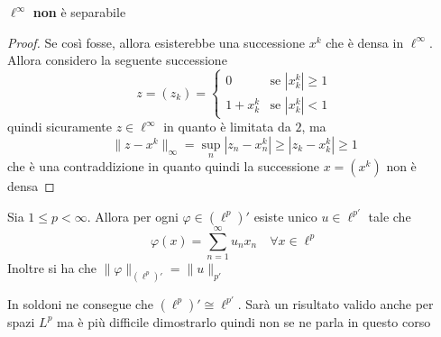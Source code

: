 \begin{proposition}
    \(\ell^{\infty}\) \textbf{non} è separabile
\end{proposition}
\begin{proof}
    Se così fosse, allora esisterebbe una successione \(x^{k}\) che è densa in
    \(\ell^{\infty}\). Allora considero la seguente successione
    \[
      z = {(z_k)} = \begin{cases}
          0 & \text{se } |x^{k}_{k}| \ge 1 \\
          1 + x^{k}_k & \text{se } |x^{k}_{k}| < 1
      \end{cases}
    \]
    quindi sicuramente \(z \in \ell^{\infty}\) in quanto è limitata da \(2\), ma
    \[\|z - x^{k}\|_{\infty} = \sup_n |z_{n} - x^{k}_n| \ge |z_k - x^{k}_k| \ge
    1\] 
    che è una contraddizione in quanto quindi la successione \(x= {(x^{k})}\)
    non è densa
\end{proof}
\begin{theorem}
    Sia \(1 \le p < \infty\). Allora per ogni \(\varphi  \in {(\ell^{p})}'\)
    esiste unico \(u \in \ell^{p'}\) tale che 
    \[
      \varphi {(x)} = \sum_{n=1}^{\infty} u_{n} x_{n} \quad \forall x \in
      \ell^{p} 
    \]
    Inoltre si ha che \(\|\varphi \|_{(\ell^{p})'} = \|u\|_{p'} \) 
\end{theorem}
\begin{remark}
    In soldoni ne consegue che \((\ell^{p})' \cong \ell^{p'}\). Sarà un
    risultato valido anche per spazi \(L^{p}\) ma è più difficile dimostrarlo
    quindi non se ne parla in questo corso
\end{remark}
